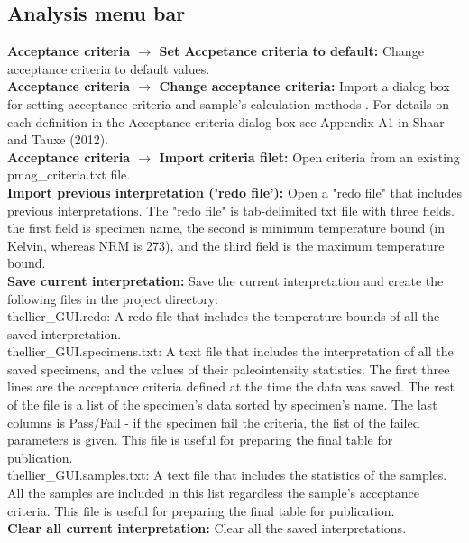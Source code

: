 \documentclass[12pt]{article}
\begin{document}
\subsection{Analysis menu bar}
{\bf Acceptance criteria   $\rightarrow $  Set Accpetance criteria to default: } Change acceptance criteria to default values.\\
{\bf Acceptance criteria   $\rightarrow $  Change acceptance criteria: } Import a dialog box for setting acceptance criteria and sample's calculation methods . For details on each definition in the Acceptance criteria dialog box see Appendix A1 in Shaar and Tauxe (2012).\\
{\bf Acceptance criteria   $\rightarrow $  Import criteria filet: } Open criteria from an existing pmag\_criteria.txt file. \\
{\bf Import previous interpretation ('redo file'):} Open a "redo file" that includes previous interpretations. The "redo file" is tab-delimited txt file with three fields. the first field is specimen name, the second is minimum temperature bound (in Kelvin, whereas NRM is 273), and the third field is the maximum temperature bound.\\
{\bf Save current interpretation:} Save the current interpretation and create the following files in the project directory:\\
thellier\_GUI.redo: A redo file that includes the temperature bounds of all the saved interpretation.\\
thellier\_GUI.specimens.txt: A text file that includes the interpretation of all the saved specimens, and the values of their paleointensity statistics. The first three lines are the acceptance criteria defined at the time the data was saved.  The rest of the file is a list of the specimen's data sorted by specimen's name.  The last columns is Pass/Fail - if the specimen fail the criteria, the list of the failed parameters is given. This file is useful for preparing the final table for publication.\\
thellier\_GUI.samples.txt: A text file that includes the statistics of the samples. All the samples are included in this list regardless the sample's acceptance criteria. This file is useful for preparing the final table for publication.\\
{\bf Clear all current interpretation:}  Clear all the saved interpretations.\\
\end{document}
